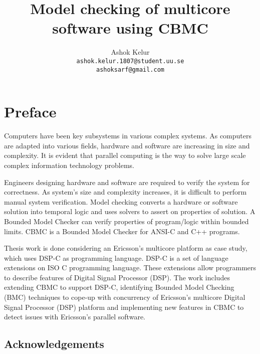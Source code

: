 \documentclass[titlepage]{book}
\author{Ashok Kelur\\\texttt{ashok.kelur.1807@student.uu.se}\\\texttt{ashoksarf@gmail.com}}
\title{Model checking of multicore software using CBMC}
\date{}
\begin{document}
\newif\ifericsson

\frontmatter

\section{Preface}


Computers have been key subsystems in various complex systems. As computers are adapted into various fields, hardware and software are increasing in size and complexity. It is evident that parallel computing is the way to solve large scale complex information technology problems.

Engineers designing hardware and software are required to verify the system for correctness. As system's size and complexity increases, it is difficult to perform manual system verification. Model checking converts a hardware or software solution into temporal logic and uses solvers to assert on properties of solution. A Bounded Model Checker can verify properties of program/logic within bounded limits. CBMC is a Bounded Model Checker for ANSI-C and C++ programs.



Thesis work is done considering an Ericsson's multicore platform as case study, which uses DSP-C as programming language. DSP-C is a set of language extensions on ISO C programming language. These extensions allow programmers to describe features of Digital Signal Processor (DSP). The work includes extending CBMC to support DSP-C, identifying Bounded Model Checking (BMC) techniques to cope-up with concurrency of Ericsson's multicore Digital Signal Processor (DSP) platform and implementing new features in CBMC to detect issues with Ericsson's parallel software. 


\tableofcontents
\listoffigures
\listoftables


\newpage
\cleardoublepage
\begin{center}
\section{Acknowledgements}
\end{center}
\end{document}
